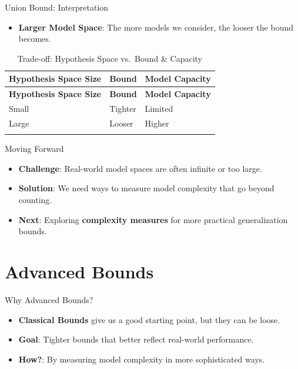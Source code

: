 \documentclass[
  ignorenonframetext,
]{beamer}
\providecommand{\tightlist}{%
  \setlength{\itemsep}{0pt}\setlength{\parskip}{0pt}}\usepackage{longtable,booktabs,array}
\begin{document}
\begin{frame}{Union Bound: Interpretation}
\label{union-bound-interpretation}
\begin{itemize}
\tightlist
\item
  \textbf{Larger Model Space}: The more models we consider, the looser
  the bound becomes.
\end{itemize}

\begin{longtable}[]{@{}lll@{}}
\caption{Trade-off: Hypothesis Space vs.~Bound \&
Capacity}\tabularnewline
\toprule\noalign{}
\textbf{Hypothesis Space Size} & \textbf{Bound} & \textbf{Model
Capacity} \\
\midrule\noalign{}
\endfirsthead
\toprule\noalign{}
\textbf{Hypothesis Space Size} & \textbf{Bound} & \textbf{Model
Capacity} \\
\midrule\noalign{}
\endhead
Small & Tighter & Limited \\
Large & Looser & Higher \\
\bottomrule\noalign{}
\end{longtable}
\end{frame}

\begin{frame}{Moving Forward}
\label{moving-forward}
\begin{itemize}
\tightlist
\item
  \textbf{Challenge}: Real-world model spaces are often infinite or too
  large.
\item
  \textbf{Solution}: We need ways to measure model complexity that go
  beyond counting.
\item
  \textbf{Next}: Exploring \textbf{complexity measures} for more
  practical generalization bounds.
\end{itemize}
\end{frame}

\section{Advanced Bounds}\label{advanced-bounds}

\begin{frame}{Why Advanced Bounds?}
\label{why-advanced-bounds}
\begin{itemize}
\tightlist
\item
  \textbf{Classical Bounds} give us a good starting point, but they can
  be loose.
\item
  \textbf{Goal}: Tighter bounds that better reflect real-world
  performance.
\item
  \textbf{How?}: By measuring model complexity in more sophisticated
  ways.
\end{itemize}
\end{frame}
\end{document}
